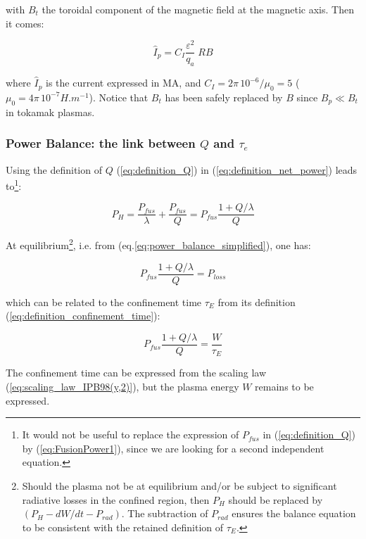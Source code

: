 \noindent
with $B_t$ the toroidal component of the magnetic field at the magnetic axis. Then it comes:

\begin{equation}
\boxed{\hat I_p = C_I \frac{\varepsilon^2}{q_a} \; R B}
\label{eq:plasma_current}
\end{equation}

\noindent
where $\hat I_p$ is the current expressed in MA, and $C_I = 2\pi\, 10^{-6} /\mu_0 = 5$  ($\mu_0 = 4\pi\, 10^{-7} \si{H.m^{-1}}$).
Notice that $B_t$ has been safely replaced by $B$ since $B_p\ll B_t$ in tokamak plasmas. 

\subsubsection{Power Balance: the link between $Q$ and $\tau_e$}



Using the definition of $Q$ (\ref{eq:definition_Q}) in (\ref{eq:definition_net_power}) leads to\footnote{It would not be useful to replace the expression of $P_{fus}$ in (\ref{eq:definition_Q}) by (\ref{eq:FusionPower1}), since we are looking for a second independent equation. }:

\begin{equation}
P_H = \frac{P_{fus}}{\lambda} + \frac{P_{fus}}{Q} = P_{fus} \frac{1 + Q/\lambda}{Q}
\end{equation}

At equilibrium\footnote{Should the plasma not be at equilibrium and/or be subject to significant radiative losses in the confined region, then $P_{H}$ should be replaced by $(P_{H}-dW/dt-P_{rad})$. The subtraction of $P_{rad}$ ensures the balance equation to be consistent with the retained definition of $\tau_E$.}, i.e. from (eq.\ref{eq:power_balance_simplified}), one has:

\begin{equation}
P_{fus} \frac{1 + Q/\lambda}{Q} = P_{loss}
\end{equation}

\noindent
which can be related to the confinement time $\tau_E$ from its definition  (\ref{eq:definition_confinement_time}):

\begin{equation}
P_{fus} \frac{1 + Q/\lambda}{Q} = \frac{ W }{ \tau_E }
\label{eq:link_btw_Q_and_tau_E}
\end{equation}

The confinement time can be expressed from the scaling law (\ref{eq:scaling_law_IPB98(y,2)}), but the plasma energy $W$ remains to be expressed.


